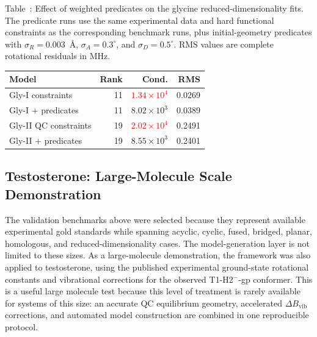 \documentclass[aip,jcp,reprint,longbibliography,floatfix]{revtex4-2}
\newcommand{\rev}[1]{\textcolor{red}{#1}}
\begin{document}
\begin{center}
\label{tab:glycine-predicate-checks}
\parbox{0.94\linewidth}{\small\raggedright Table~\thetable: Effect of weighted
predicates on the glycine reduced-dimensionality fits. The predicate runs use
the same experimental data and hard functional constraints as the corresponding
benchmark runs, plus initial-geometry predicates with $\sigma_R=0.003$~\AA{},
$\sigma_A=0.3^\circ$, and $\sigma_D=0.5^\circ$. RMS values are complete
rotational residuals in MHz.\par}
\smallskip
\small
\setlength{\tabcolsep}{3pt}
\begin{tabular}{lrrr}
\toprule
Model & Rank & Cond. & RMS \\
\midrule
Gly-I constraints & 11 & \rev{$1.34\times10^4$} & 0.0269 \\
Gly-I + predicates & 11 & $8.02\times10^3$ & 0.0389 \\
Gly-II QC constraints & 19 & \rev{$2.02\times10^4$} & 0.2491 \\
Gly-II + predicates & 19 & $8.55\times10^3$ & 0.2401 \\
\bottomrule
\end{tabular}
\end{center}

\subsection{Testosterone: Large-Molecule Scale Demonstration}

The validation benchmarks above were selected because they represent available
experimental gold standards while spanning acyclic, cyclic, fused, bridged,
planar, homologous, and reduced-dimensionality cases. The model-generation
layer is not limited to these sizes. As a large-molecule demonstration, the framework was
also applied to testosterone, using the published experimental ground-state
rotational constants and vibrational corrections for the observed
T1-H2$^{-}$-gp conformer.\cite{Uribe2024SteroidHormones} This is a useful large
molecule test because this level of treatment is rarely available for systems
of this size: an accurate QC equilibrium geometry, accelerated
$\Delta B_\mathrm{vib}$ corrections, and automated model construction are
combined in one reproducible protocol.
\end{document}
